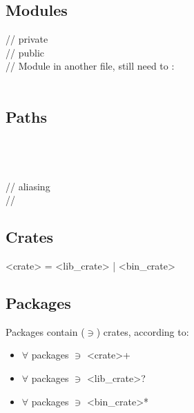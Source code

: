 \subsection*{Modules}
 // private \\
 // public \\
// Module in another file, still need to : \\
 \\
\subsection*{Paths}
 \\
 \\
 \\
 // aliasing \\
 //  \\

\subsection*{Crates}
<crate> = <lib\_crate> | <bin\_crate> \\

\subsection*{Packages}
Packages contain ($\ni$) crates, according to:
\begin{itemize}[label={}]
\item $\forall$ packages $\ni$ <crate>+ 
\item $\forall$ packages $\ni$ <lib\_crate>? 
\item $\forall$ packages $\ni$ <bin\_crate>* 
\end{itemize} \
